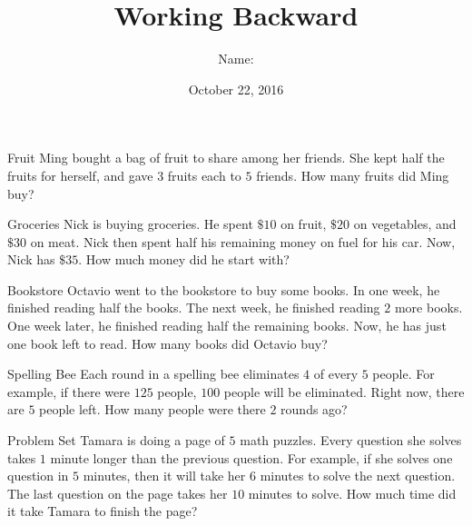 \documentclass[14pt,letterpaper]{article}
\title{Working Backward}
\author{Name: \underline{\hspace{5cm}}}
\date{October 22, 2016}
\begin{document}
\HomeworkTitle

\thispagestyle{empty}

\begin{problem}{Fruit}
 Ming bought a bag of fruit to share among her friends. She kept half the fruits
 for herself, and gave $3$ fruits each to $5$ friends. How many fruits did Ming
 buy?
\end{problem}

\begin{problem}{Groceries}
 Nick is buying groceries. He spent $\$10$ on fruit, $\$20$ on vegetables, and
 $\$30$ on meat. Nick then spent half his remaining money on fuel for his car.
 Now, Nick has $\$35$. How much money did he start with?
\end{problem}

\begin{problem}{Bookstore}
 Octavio went to the bookstore to buy some books. In one week, he finished
 reading half the books. The next week, he finished reading $2$ more books. One
 week later, he finished reading half the remaining books. Now, he has just one
 book left to read. How many books did Octavio buy?
\end{problem}

\begin{problem}{Spelling Bee}
 Each round in a spelling bee eliminates $4$ of every $5$ people. For example,
 if there were $125$ people, $100$ people will be eliminated. Right now, there
 are $5$ people left. How many people were there $2$ rounds ago?
\end{problem}

\begin{problem}{Problem Set}
 Tamara is doing a page of $5$ math puzzles. Every question she solves takes $1$
 minute longer than the previous question. For example, if she solves one
 question in $5$ minutes, then it will take her $6$ minutes to solve the next
 question. The last question on the page takes her $10$ minutes to solve. How
 much time did it take Tamara to finish the page?
\end{problem}
\end{document}
